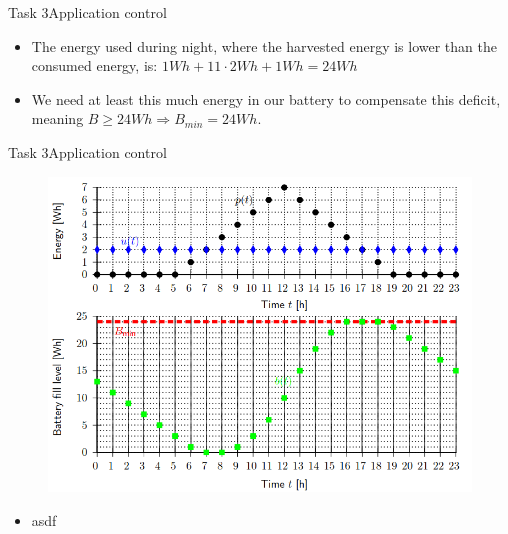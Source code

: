 \begin{frame}{Task 3}{Application control}
    \begin{solutionnoinc}
        \begin{itemize}
            \item The energy used during night, where the harvested energy is \alert{lower} than the consumed energy, is: $1Wh + 11 \cdot 2Wh + 1Wh = 24Wh$
            \item We need at least this much energy in our battery to compensate this deficit, meaning $B \geq 24Wh \Rightarrow B_{min} = 24Wh$.
        \end{itemize}
    \end{solutionnoinc}
\end{frame}
\begin{frame}{Task 3}{Application control}
  \begin{figure}
      \centering
      \includegraphics[scale=0.4]{figures/energyUsage.PNG}
  \end{figure}
  \begin{Sidenote}
    \begin{itemize}
      \item asdf
    \end{itemize}
  \end{Sidenote}
\end{frame}

